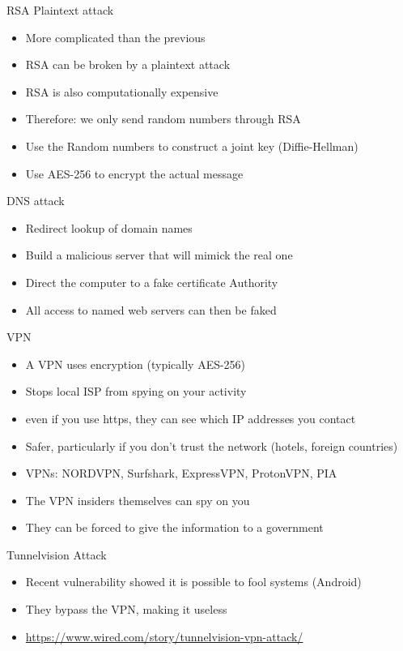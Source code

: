 \begin{withoutheadline}
\begin{frame}{RSA Plaintext attack}
\begin{itemize}
    \item More complicated than the previous
    \item RSA can be broken by a plaintext attack
    \item RSA is also computationally expensive
    \item Therefore: we only send random numbers through RSA
    \item Use the Random numbers to construct a joint key (Diffie-Hellman)
    \item Use AES-256 to encrypt the actual message
\end{itemize}
\end{frame}

\begin{frame}{DNS attack}
\begin{itemize}
    \item Redirect lookup of domain names
    \item Build a malicious server that will mimick the real one
    \item Direct the computer to a fake certificate Authority
    \item All access to named web servers can then be faked
\end{itemize}
\end{frame}

\begin{frame}{VPN}
\begin{itemize}
    \item A VPN uses encryption (typically AES-256)
    \item Stops local ISP from spying on your activity
    \item even if you use https, they can see which IP addresses you contact
    \item Safer, particularly if you don't trust the network (hotels, foreign countries)
    \item VPNs: NORDVPN, Surfshark, ExpressVPN, ProtonVPN, PIA 
    \item The VPN insiders themselves can spy on you
    \item They can be forced to give the information to a government
\end{itemize}
\end{frame}

\begin{frame}{Tunnelvision Attack}
\begin{itemize}
    \item Recent vulnerability showed it is possible to fool systems (Android)
    \item They bypass the VPN, making it useless
    \item \url{https://www.wired.com/story/tunnelvision-vpn-attack/}
\end{itemize}
\end{frame}


\end{withoutheadline}
